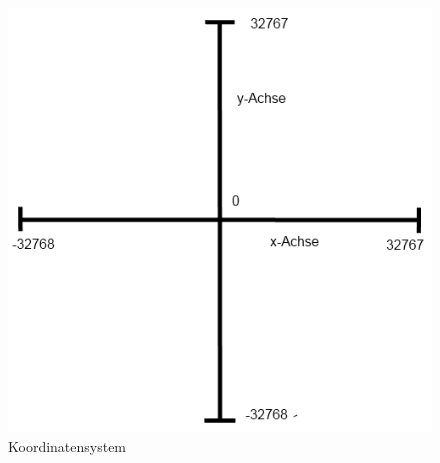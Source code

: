 \begin{figure}[htbp]
\centering 
\includegraphics[scale=0.5]{src/koordinatensystem.png}
\caption{Koordinatensystem} %
\label{Koordinatensystem} %
\end{figure}

